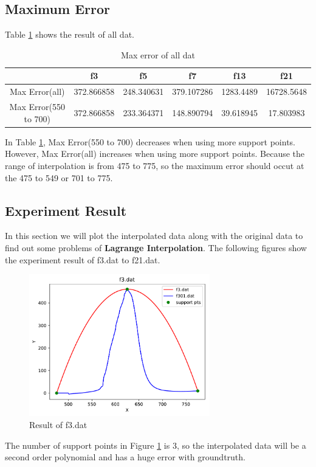 \documentclass{article}
\begin{document}
\subsection{Maximum Error}
Table \ref{tab:error} shows the result of all dat.
\begin{table}[H]
  \centering
    \begin{tabular}{|c|c|c|c|c|c|}
    \hline
        & f3  & f5  & f7  & f13 & f21 \bigstrut\\
    \hline
    Max Error(all) & 372.866858 & 248.340631 & 379.107286 & 1283.4489 & 16728.5648 \bigstrut\\
    \hline
    Max Error(550 to 700) & 372.866858 & 233.364371 & 148.890794 & 39.618945 & 17.803983 \bigstrut\\
    \hline
    \end{tabular}%
  \caption{Max error of all dat}
  \label{tab:error}%
\end{table}%
In Table \ref{tab:error}, Max Error(550 to 700) decreases when using more support points. However, Max Error(all) increases
when using more support points. Because the range of interpolation is from 475 to 775, so the maximum error should occut at the
475 to 549 or 701 to 775.

\subsection{Experiment Result}
In this section we will plot the interpolated data along with the original data to find out some problems of 
\textbf{Lagrange Interpolation}. The following figures show the experiment result of f3.dat to f21.dat.
\begin{figure}[H]
    \centering
    \includegraphics[width=0.7\textwidth]{src/f3.pdf}
    \caption{Result of f3.dat}
    \label{fig:f3}
\end{figure}
The number of support points in Figure \ref{fig:f3} is 3, so the interpolated data will be a second order polynomial and has a
huge error with groundtruth.
\end{document}
